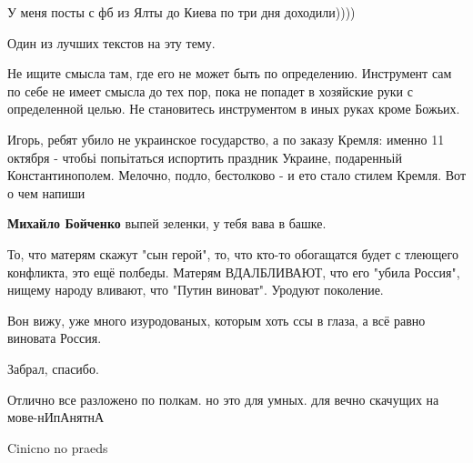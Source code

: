 \begin{itemize}
У меня посты с фб из Ялты до Киева по три дня доходили))))

Один из лучших текстов на эту тему.

Не ищите смысла там, где его не может быть по определению. Инструмент сам по себе не имеет смысла до тех пор, пока не попадет в хозяйские руки с определенной целью. Не становитесь инструментом в иных руках кроме Божьих.

Игорь, ребят убило не украинское государство, а по заказу Кремля: именно 11 октября - чтобьі попьітаться испортить праздник Украине, подаренньій Константинополем. Мелочно, подло, бестолково - и ето стало стилем Кремля. Вот о чем напиши

\begin{itemize} %
\textbf{Михайло Бойченко} выпей зеленки, у тебя вава в башке.
\end{itemize} %


То, что матерям скажут "сын герой", то, что кто-то обогащатся будет с тлеющего
конфликта, это ещё полбеды. Матерям ВДАЛБЛИВАЮТ, что его "убила Россия",
нищему народу вливают, что "Путин виноват". Уродуют поколение.

Вон вижу, уже много изуродованых, которым хоть ссы в глаза, а всё равно виновата Россия.

Забрал, спасибо.

Отлично все разложено по полкам. но это для умных. для вечно скачущих на мове-нИпАнятнА

Cinicno no praeds

\end{itemize} %
